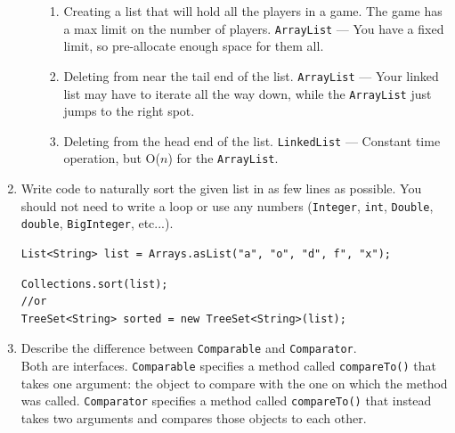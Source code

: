 \documentclass[11pt]{article}
\newenvironment{answer}{\large\lstset{basicstyle=\tiny\ttfamily}\color{white} }{}
\newenvironment{answer}{\large\lstset{basicstyle=\large\ttfamily}\color{red} }{}
\begin{document}
\begin{enumerate}
\begin{enumerate}
\begin{enumerate}
		\item Creating a list that will hold all the players in a game.  The game has a max limit on the number of players.
		\begin{answer}
		\texttt{ArrayList} --- You have a fixed limit, so pre-allocate enough space for them all.
		\end{answer}
 
		\item Deleting from near the tail end of the list.
		\begin{answer}
		\texttt{ArrayList} --- Your linked list may have to iterate all the way down, while the \texttt{ArrayList} just jumps to the right spot.
		\end{answer}
				
		\item Deleting from the head end of the list.
		\begin{answer}
		\texttt{LinkedList} --- Constant time operation, but O($n$) for the \texttt{ArrayList}.
		\end{answer}
				
	\end{enumerate}

\end{enumerate}  


\vspace{24pt}
\item Write code to naturally sort the given list in as few lines as possible. You should not need to write a loop or use any numbers (\texttt{Integer}, \texttt{int}, \texttt{Double}, \texttt{double},
\texttt{BigInteger}, etc...).
\begin{verbatim}
List<String> list = Arrays.asList("a", "o", "d", f", "x");
\end{verbatim}
\begin{answer}
\begin{verbatim}
Collections.sort(list);
//or
TreeSet<String> sorted = new TreeSet<String>(list);
\end{verbatim}
\end{answer}


\item Describe the difference between \texttt{Comparable} and \texttt{Comparator}. \\
\begin{answer}
Both are interfaces.
\texttt{Comparable} specifies a method called \texttt{compareTo()} that takes one argument: the object to compare with the one on which the method was called.
\texttt{Comparator} specifies a method called \texttt{compareTo()} that instead takes two arguments and compares those objects to each other.


\end{answer}
\end{enumerate}
\end{document}
